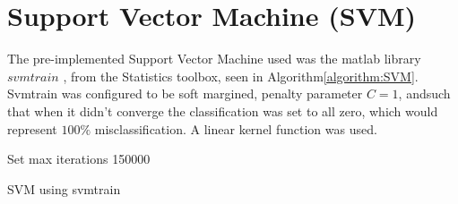 \section{Support Vector Machine (SVM)}
The pre-implemented Support Vector Machine used was the matlab library $svmtrain$ \citep{svmtrain_ref}, from the Statistics toolbox, seen in Algorithm\ref{algorithm:SVM}.  Svmtrain was configured to be soft margined, penalty parameter $C = 1$, andsuch that when it didn't converge the classification was set to all zero, which would represent $100\%$ misclassification. A linear kernel function was used. \\
\begin{algorithm}[H]
\SetAlgoLined
{}

Set max iterations 150000 \\
 \caption{SVM using svmtrain}
 \label{algorithm:SVM}
\end{algorithm}

